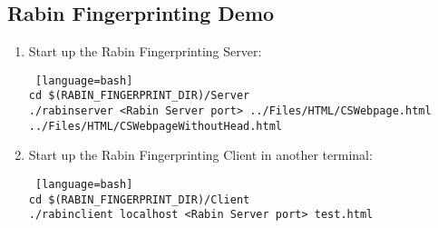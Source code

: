 \subsection{Rabin Fingerprinting Demo}

\begin{enumerate}

\item 

Start up the Rabin Fingerprinting Server:

\begin{lstlisting} [language=bash] 
cd $(RABIN_FINGERPRINT_DIR)/Server
./rabinserver <Rabin Server port> ../Files/HTML/CSWebpage.html ../Files/HTML/CSWebpageWithoutHead.html
\end{lstlisting}

\item Start up the Rabin Fingerprinting Client in another terminal:

\begin{lstlisting} [language=bash] 
cd $(RABIN_FINGERPRINT_DIR)/Client
./rabinclient localhost <Rabin Server port> test.html
\end{lstlisting}

\end{enumerate}